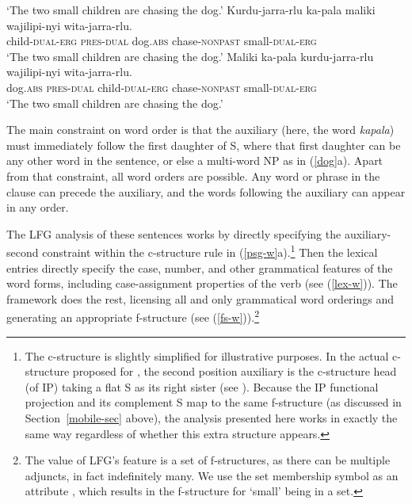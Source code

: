  \begin{exe} 
\ex	\label{dog}
\begin{xlist}
\ex
{}
\glt `The two small children are chasing the dog.' 
\ex 
\gll Kurdu-jarra-rlu ka-pala maliki wajilipi-nyi wita-jarra-rlu. \\
child-\textsc{dual-erg}  \textsc{pres-dual}
dog.\textsc{abs} chase-\textsc{nonpast} small-\textsc{dual-erg}\\
\glt `The two small children are chasing the dog.' 
\ex 
\gll Maliki ka-pala  kurdu-jarra-rlu wajilipi-nyi wita-jarra-rlu. \\
dog.\textsc{abs} \textsc{pres-dual} child-\textsc{dual-erg} chase-\textsc{nonpast} small-\textsc{dual-erg} 
\\
\glt `The two small children are chasing the dog.' 
\end{xlist}
\end{exe}
\largerpage
The main constraint on word order is that the auxiliary (here, the word \textit{kapala}) must immediately follow the first daughter of S, where that first daughter can be any other word in the sentence, or else a multi-word NP as in (\ref{dog}a).  Apart from that constraint, all word orders are possible.  Any word or phrase in the clause can precede the auxiliary, and the words following the auxiliary can appear in any order. 

The LFG analysis of these sentences works by directly specifying the auxiliary-second constraint within the c-structure rule in (\ref{psg-w}a).\footnote{The c-structure is slightly simplified for illustrative purposes. In the actual c-structure proposed for , the second position auxiliary is the c-structure head (of IP) taking a flat S as its right sister (see \citealt[225]{austin+bresnan:1996}).  Because the IP functional projection and its complement S map to the same f-structure (as discussed in Section~\ref{mobile-sec} above),  the analysis presented here works in exactly the same way regardless of whether this extra structure appears.}  Then the lexical entries directly specify the case, number, and other grammatical features of the word forms, including case-assignment properties of the verb (see (\ref{lex-w})).  The framework does the rest, licensing all and only grammatical word orderings and generating an appropriate f-structure (see (\ref{fs-w})).\footnote{The value of LFG's  feature is a set of f-structures, as there can be multiple adjuncts, in fact indefinitely many. We use the set membership symbol as an attribute \citep[229--230]{dalrymple;ea19}, which results in the f-structure for `small' being in a set.}

